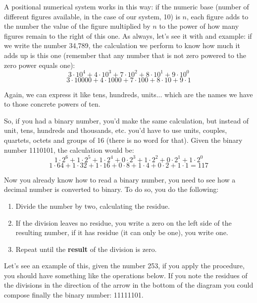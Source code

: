 \documentclass[a4paper]{article}
\begin{document}
A positional numerical system works in this way: if the numeric base (number of
different figures available, in the case of our system, 10) is $n$, each figure
adds to the number the value of the figure multiplied by $n$ to the power of
how many figures remain to the right of this one. As always, let's see it with
and example: if we write the number 34,789, the calculation we perform to
know how much it adds up is this one (remember that any number that is not zero
powered to the zero power equals one):
$$
3\cdot10^4+4\cdot10^3+7\cdot10^2+8\cdot10^1+9\cdot10^0
$$
$$
3\cdot10000+4\cdot1000+7\cdot100+8\cdot10+9\cdot1
$$

Again, we can express it like tens, hundreds, units... which are the names
we have to those concrete powers of ten.

So, if you had a binary number, you'd make the same calculation, but instead of
unit, tens, hundreds and thousands, etc. you'd have to use units, couples,
quartets, octets and groups of 16 (there is no word for that). Given the binary
number 1110101, the calculation would be:
$$
1\cdot2^6+ 1\cdot2^5+1\cdot2^4+0\cdot2^3+1\cdot2^2+0\cdot2^1+1\cdot2^0
$$
$$
1\cdot64+ 1\cdot32+1\cdot16+0\cdot8+1\cdot4+0\cdot2+1\cdot1=117
$$

Now you already know how to read a binary number, you need to see how a decimal
number is converted to binary. To do so, you do the following:
\begin{enumerate}
\item Divide the number by two, calculating the residue.
\item If the division leaves no residue, you write a zero on the left side of
the resulting number, if it has residue (it can only be one), you write one.
\item Repeat until the \textbf{result} of the division is zero.
\end{enumerate}

Let's see an example of this, given the number 253, if you apply the procedure,
you should have something like the operations below. If you note the residues of
the divisions in the direction of the arrow in the bottom of the diagram you
could compose finally the binary number: 11111101.
\end{document}
